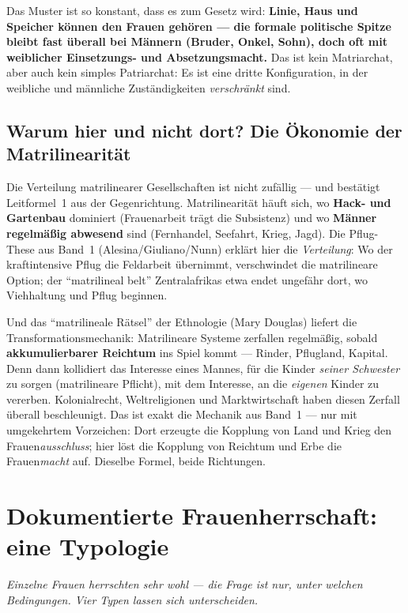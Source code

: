 \documentclass[11pt,a4paper,ngerman]{scrartcl}
\newcommand{\chipbase}[2]{\hspace{0pt}{\footnotesize\textcolor{#1}{[\textsc{#2}]}}}
\newcommand{\chipbelegt}[1]{\chipbase{chipgreen}{#1}}
\newcommand{\chipplausibel}[1]{\chipbase{chipamber}{#1}}
\begin{document}
Das Muster ist so konstant, dass es zum Gesetz wird: \textbf{Linie, Haus und Speicher können den Frauen gehören --- die formale politische Spitze bleibt fast überall bei Männern (Bruder, Onkel, Sohn), doch oft mit weiblicher Einsetzungs- und Absetzungsmacht.} Das ist kein Matriarchat, aber auch kein simples Patriarchat: Es ist eine dritte Konfiguration, in der weibliche und männliche Zuständigkeiten \emph{verschränkt} sind. \chipbelegt{belegt}

\subsection*{Warum hier und nicht dort? Die Ökonomie der Matrilinearität}
Die Verteilung matrilinearer Gesellschaften ist nicht zufällig --- und bestätigt Leitformel~1 aus der Gegenrichtung. Matrilinearität häuft sich, wo \textbf{Hack- und Gartenbau} dominiert (Frauenarbeit trägt die Subsistenz) und wo \textbf{Männer regelmäßig abwesend} sind (Fernhandel, Seefahrt, Krieg, Jagd). Die Pflug-These aus Band~1 (Alesina/Giuliano/Nunn) erklärt hier die \emph{Verteilung}: Wo der kraftintensive Pflug die Feldarbeit übernimmt, verschwindet die matrilineare Option; der \enquote{matrilineal belt} Zentralafrikas etwa endet ungefähr dort, wo Viehhaltung und Pflug beginnen. \chipplausibel{plausibel}

Und das \enquote{matrilineale Rätsel} der Ethnologie (Mary Douglas) liefert die Transformationsmechanik: Matrilineare Systeme zerfallen regelmäßig, sobald \textbf{akkumulierbarer Reichtum} ins Spiel kommt --- Rinder, Pflugland, Kapital. Denn dann kollidiert das Interesse eines Mannes, für die Kinder \emph{seiner Schwester} zu sorgen (matrilineare Pflicht), mit dem Interesse, an die \emph{eigenen} Kinder zu vererben. Kolonialrecht, Weltreligionen und Marktwirtschaft haben diesen Zerfall überall beschleunigt. \chipbelegt{belegt} Das ist exakt die Mechanik aus Band~1 --- nur mit umgekehrtem Vorzeichen: Dort erzeugte die Kopplung von Land und Krieg den Frauen\emph{ausschluss}; hier löst die Kopplung von Reichtum und Erbe die Frauen\emph{macht} auf. Dieselbe Formel, beide Richtungen.

\section{Dokumentierte Frauenherrschaft: eine Typologie}
\noindent\textit{Einzelne Frauen herrschten sehr wohl --- die Frage ist nur, unter welchen Bedingungen. Vier Typen lassen sich unterscheiden.}
\medskip
\end{document}
